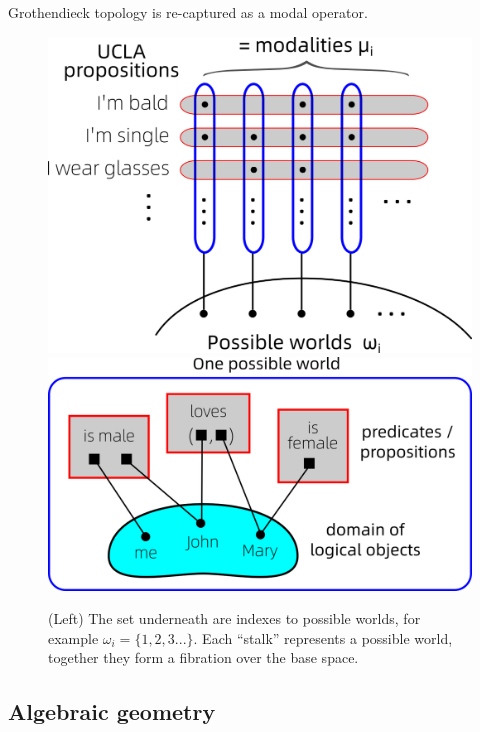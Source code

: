 \documentclass[runningheads]{llncs}
\begin{document}
Grothendieck topology is re-captured as a modal operator.

\begin{figure}
	\includegraphics[scale=.4]{possible-worlds-as-sheaf.png} \qquad
	\includegraphics[scale=.35]{possible-world-single-example.png}
	\caption{(Left) The set underneath are indexes to possible worlds, for example $\omega_i = \{1,2,3...\}$. Each ``stalk'' represents a possible world, together they form a fibration over the base space.}
	\label{fig:possible-worlds-as-sheaf}
\end{figure}

\subsection{Algebraic geometry}
\end{document}
